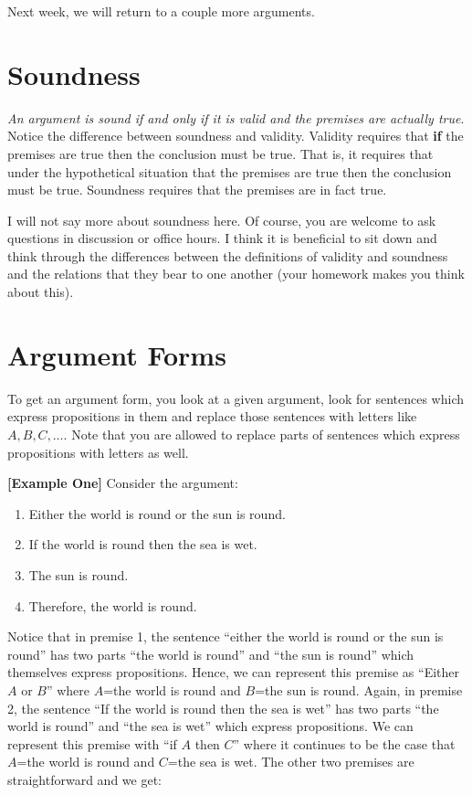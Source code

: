 \documentclass[
]{book}
\providecommand{\tightlist}{%
  \setlength{\itemsep}{0pt}\setlength{\parskip}{0pt}}
\begin{document}
Next week, we will return to a couple more arguments.

\hypertarget{soundness}{%
\section{Soundness}\label{soundness}}

\emph{An argument is sound if and only if it is valid and the premises are actually true}. Notice the difference between soundness and validity. Validity requires that \textbf{if} the premises are true then the conclusion must be true. That is, it requires that under the hypothetical situation that the premises are true then the conclusion must be true. Soundness requires that the premises are in fact true.

I will not say more about soundness here. Of course, you are welcome to ask questions in discussion or office hours. I think it is beneficial to sit down and think through the differences between the definitions of validity and soundness and the relations that they bear to one another (your homework makes you think about this).

\hypertarget{argument-forms}{%
\section{Argument Forms}\label{argument-forms}}

To get an argument form, you look at a given argument, look for sentences which express propositions in them and replace those sentences with letters like \(A,B,C,\ldots\). Note that you are allowed to replace parts of sentences which express propositions with letters as well.

\textbf{{[}Example One{]}} Consider the argument:

\begin{enumerate}
\def\labelenumi{\arabic{enumi}.}
\tightlist
\item
  Either the world is round or the sun is round.
\item
  If the world is round then the sea is wet.
\item
  The sun is round.
\item
  Therefore, the world is round.
\end{enumerate}

Notice that in premise 1, the sentence ``either the world is round or the sun is round'' has two parts ``the world is round'' and ``the sun is round'' which themselves express propositions. Hence, we can represent this premise as ``Either \(A\) or \(B\)'' where \(A\)=the world is round and \(B\)=the sun is round. Again, in premise 2, the sentence ``If the world is round then the sea is wet'' has two parts ``the world is round'' and ``the sea is wet'' which express propositions. We can represent this premise with ``if \(A\) then \(C\)'' where it continues to be the case that \(A\)=the world is round and \(C\)=the sea is wet. The other two premises are straightforward and we get:
\end{document}
